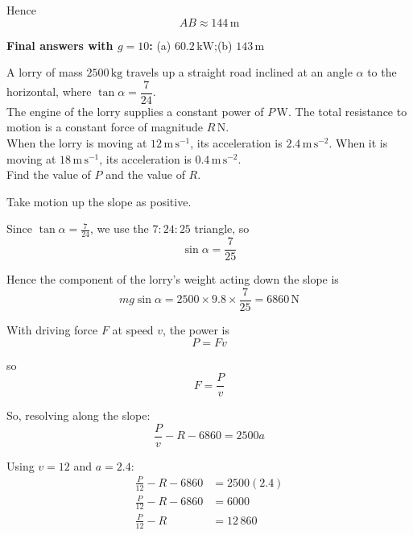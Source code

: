 \documentclass[leqno]{article}
\begin{document}
\begin{enumerate}[
  label=\textbf{\arabic*.},
  leftmargin=*,
  topsep=0pt,
  partopsep=0pt,
  parsep=0pt
]
\begin{djsSolution}
\begin{enumerate}[label=\textbf{(\alph*)}, start=1]
  Hence
  \[
  AB\approx 144\,\mathrm{m}
  \]
\end{enumerate}
\par\medskip\noindent\textbf{Final answers with \(g = 10\):} (a) \(60.2\,\mathrm{kW}\);\quad (b) \(143\,\mathrm{m}\)
\end{djsSolution}


\newpage

\questionitem

A lorry of mass $2500\,\mathrm{kg}$ travels up a straight road inclined at an angle $\alpha$ to the horizontal, where $\tan\alpha=\dfrac{7}{24}$. \\

The engine of the lorry supplies a constant power of $P\,\mathrm{W}$. The total resistance to motion is a constant force of magnitude $R\,\mathrm{N}$. \\

When the lorry is moving at $12\,\mathrm{m\,s^{-1}}$, its acceleration is $2.4\,\mathrm{m\,s^{-2}}$. When it is moving at $18\,\mathrm{m\,s^{-1}}$, its acceleration is $0.4\,\mathrm{m\,s^{-2}}$. \\

Find the value of $P$ and the value of $R$.  \\

\vspace*{10pt}

\begin{djsSolution}
Take motion up the slope as positive.

Since \(\tan\alpha=\frac{7}{24}\), we use the \(7\!:\!24\!:\!25\) triangle, so
\[
\sin\alpha=\frac{7}{25}
\]

Hence the component of the lorry's weight acting down the slope is
\[
mg\sin\alpha=2500\times 9.8\times \frac{7}{25}=6860\,\mathrm{N}
\]

With driving force \(F\) at speed \(v\), the power is
\[
P=Fv
\]

so
\[
F=\frac{P}{v}
\]

So, resolving along the slope:
\[
\frac{P}{v}-R-6860=2500a
\]

Using \(v=12\) and \(a=2.4\):
\begin{align*}
\frac{P}{12}-R-6860&=2500(2.4)\\
\frac{P}{12}-R-6860&=6000\\
\frac{P}{12}-R&=12\,860
\end{align*}


\end{djsSolution}
\end{enumerate}
\end{document}
